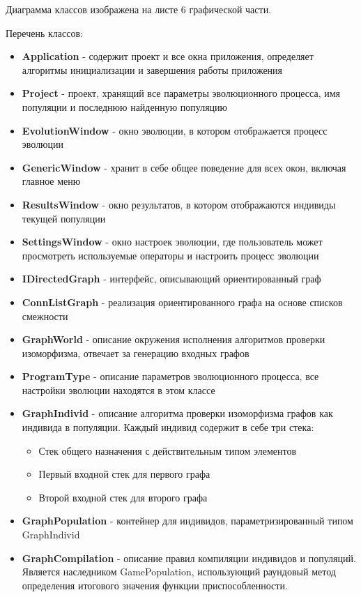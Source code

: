 \documentclass[russian,utf8,emptystyle]{eskdtext}
\begin{document}
Диаграмма классов изображена на листе 6 графической части.

Перечень классов:
\begin{itemize}
\item \textbf{Application} - содержит проект и все окна приложения, определяет алгоритмы инициализации и завершения работы приложения
\item \textbf{Project} - проект, хранящий все параметры эволюционного процесса, имя популяции и последнюю найденную популяцию
\item \textbf{EvolutionWindow} - окно эволюции, в котором отображается процесс эволюции
\item \textbf{GenericWindow} - хранит в себе общее поведение для всех окон, включая главное меню
\item \textbf{ResultsWindow} - окно результатов, в котором отображаются индивиды текущей популяции
\item \textbf{SettingsWindow} - окно настроек эволюции, где пользователь может просмотреть используемые операторы и настроить процесс эволюции
\item \textbf{IDirectedGraph} - интерфейс, описывающий ориентированный граф
\item \textbf{ConnListGraph} - реализация ориентированного графа на основе списков смежности
\item \textbf{GraphWorld} - описание окружения исполнения алгоритмов проверки изоморфизма, отвечает за генерацию входных графов
\item \textbf{ProgramType} - описание параметров эволюционного процесса, все настройки эволюции находятся в этом классе
\item \textbf{GraphIndivid} - описание алгоритма проверки изоморфизма графов как индивида в популяции. Каждый индивид содержит в себе три стека:
\begin{itemize}
\item Стек общего назначения с действительным типом элементов
\item Первый входной стек для первого графа
\item Второй входной стек для второго графа
\end{itemize}
\item \textbf{GraphPopulation} - контейнер для индивидов, параметризированный типом GraphIndivid
\item \textbf{GraphCompilation} - описание правил компиляции индивидов и популяций. Является наследником GamePopulation, использующий раундовый метод определения итогового значения функции приспособленности.

\end{itemize}
\end{document}
